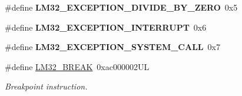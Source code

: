 \begin{DoxyCompactItemize}
\#define {\bfseries L\+M32\+\_\+\+E\+X\+C\+E\+P\+T\+I\+O\+N\+\_\+\+D\+I\+V\+I\+D\+E\+\_\+\+B\+Y\+\_\+\+Z\+E\+RO}~0x5
\item 
\mbox{\label{group__lm32__gdb_ga49915ed4c234922917be24b9e6c8331c}} 
\#define {\bfseries L\+M32\+\_\+\+E\+X\+C\+E\+P\+T\+I\+O\+N\+\_\+\+I\+N\+T\+E\+R\+R\+U\+PT}~0x6
\item 
\mbox{\label{group__lm32__gdb_ga4c68aa29e408736b46b1df1daade2825}} 
\#define {\bfseries L\+M32\+\_\+\+E\+X\+C\+E\+P\+T\+I\+O\+N\+\_\+\+S\+Y\+S\+T\+E\+M\+\_\+\+C\+A\+LL}~0x7
\item 
\mbox{\label{group__lm32__gdb_gacb400ae2705da04506f416e07e5172de}} 
\#define \mbox{\hyperlink{group__lm32__gdb_gacb400ae2705da04506f416e07e5172de}{L\+M32\+\_\+\+B\+R\+E\+AK}}~0xac000002\+UL
\begin{DoxyCompactList}\small\item\em Breakpoint instruction. \end{DoxyCompactList}\end{DoxyCompactItemize}
